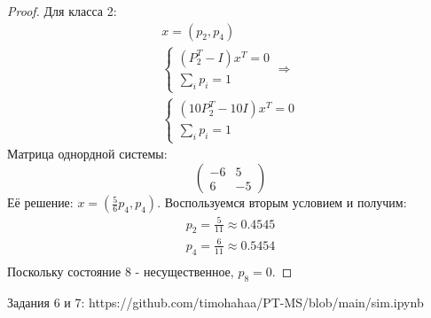\begin{proof}
Для класса 2:
\begin{gather*}
    x = (p_2, p_4)\\
    \begin{cases}
        (P_2^T - I)x^T = 0 \\
        \sum_i p_i = 1
    \end{cases} \Rightarrow \\
    \begin{cases}
        (10P_2^T - 10I)x^T = 0 \\
        \sum_i p_i = 1
    \end{cases}
\end{gather*}
Матрица однордной системы:
\[
\begin{pmatrix}
    -6 & 5 \\
     6 & -5
\end{pmatrix}
\]
Её решение: $x = (\frac{5}{6}p_4, p_4)$. Воспользуемся вторым условием и получим:\\
\begin{gather*}
    p_2 = \frac{5}{11}\approx 0.4545\\
    p_4 = \frac{6}{11}\approx 0.5454\\
\end{gather*}
Поскольку состояние 8 - несущественное, $p_8 = 0$.
\end{proof}

Задания 6 и 7: https://github.com/timohahaa/PT-MS/blob/main/sim.ipynb